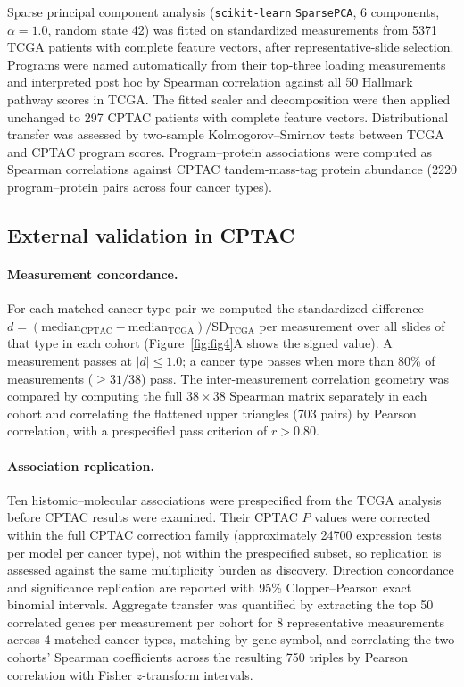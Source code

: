 Sparse principal component analysis (\texttt{scikit-learn} \texttt{SparsePCA},
6 components, $\alpha = 1.0$, random state 42) was fitted on standardized
measurements from \num{5371} TCGA patients with complete feature vectors, after
representative-slide selection. Programs were named automatically from their
top-three loading measurements and interpreted post hoc by Spearman correlation
against all 50 Hallmark pathway scores in TCGA. The fitted scaler and
decomposition were then applied unchanged to 297 CPTAC patients with complete
feature vectors. Distributional transfer was assessed by two-sample
Kolmogorov--Smirnov tests between TCGA and CPTAC program scores. Program--protein
associations were computed as Spearman correlations against CPTAC tandem-mass-tag
protein abundance (\num{2220} program--protein pairs across four cancer types).

\subsection{External validation in CPTAC}
\label{sec:methods:validation}

\paragraph{Measurement concordance.}
For each matched cancer-type pair we computed the standardized difference
$d = (\mathrm{median}_{\mathrm{CPTAC}} - \mathrm{median}_{\mathrm{TCGA}}) /
\mathrm{SD}_{\mathrm{TCGA}}$ per measurement over all slides of that type in each
cohort (Figure~\ref{fig:fig4}A shows the signed value). A measurement passes at
$|d| \leq 1.0$; a cancer type passes when more than 80\% of measurements
($\geq 31/38$) pass. The inter-measurement correlation geometry was compared by
computing the full $38 \times 38$ Spearman matrix separately in each cohort and
correlating the flattened upper triangles (703 pairs) by Pearson correlation,
with a prespecified pass criterion of $r > 0.80$.

\paragraph{Association replication.}
Ten histomic--molecular associations were prespecified from the TCGA analysis
before CPTAC results were examined. Their CPTAC $P$ values were corrected within
the full CPTAC correction family (approximately \num{24700} expression tests per
model per cancer type), not within the prespecified subset, so replication is
assessed against the same multiplicity burden as discovery. Direction
concordance and significance replication are reported with 95\% Clopper--Pearson
exact binomial intervals. Aggregate transfer was quantified by extracting the top
50 correlated genes per measurement per cohort for 8 representative measurements
across 4 matched cancer types, matching by gene symbol, and correlating the two
cohorts' Spearman coefficients across the resulting 750 triples by Pearson
correlation with Fisher $z$-transform intervals.

